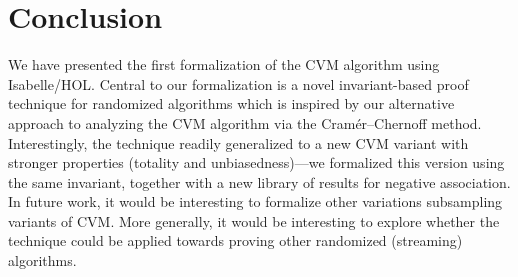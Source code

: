 \section{Conclusion}\label{sec:conclusion}
We have presented the first formalization of the CVM algorithm using Isabelle/HOL.
Central to our formalization is a novel invariant-based proof technique for randomized algorithms which is inspired by our alternative approach to analyzing the CVM algorithm via the Cram\'{e}r--Chernoff method.
Interestingly, the technique readily generalized to a new CVM variant with stronger properties (totality and unbiasedness)---we formalized this version using the same invariant, together with a new library of results for negative association.
In future work, it would be interesting to formalize other variations subsampling variants of CVM.
More generally, it would be interesting to explore whether the technique could be applied towards proving other randomized (streaming) algorithms.
